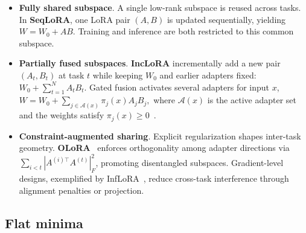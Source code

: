 \documentclass[10pt]{article} %
\begin{document}
\begin{itemize}
    \item  \textbf{Fully shared subspace}. A single low-rank subspace is reused across tasks. In \textbf{SeqLoRA}, one LoRA pair $(A,B)$ is updated sequentially, yielding $W = W_0 + AB .$ Training and inference are both restricted to this common subspace.
    \item  \textbf{Partially fused subspaces}. \textbf{IncLoRA} incrementally add a new pair $(A_t,B_t)$ at task $t$ while keeping $W_0$ and earlier adapters fixed:  $W_0 + \sum_{t=1}^N A_t B_t$.  Gated fusion activates several adapters for input $x$, $W = W_0 + \sum_{j \in \mathcal{A}(x)} \pi_j(x) A_j B_j ,$ where $\mathcal{A}(x)$ is the active adapter set and the weights satisfy $\pi_j(x)\ge 0$~\citep{zhao-etal-2024-sapt,cheng2025exploiting}.
 
    \item  \textbf{Constraint-augmented sharing}. Explicit regularization shapes inter-task geometry. \textbf{OLoRA}~\citep{wang2023orthogonal} enforces orthogonality among adapter directions via $\sum_{i<t}|A^{(i)\top}A^{(t)}|_F^2$, promoting disentangled subspaces. Gradient-level designs, exemplified by {InfLoRA}~\citep{Liang_2024_CVPR}, reduce cross-task interference through alignment penalties or projection.
\end{itemize}


\subsection{Flat minima}
\label{sec: flat minima}
\end{document}
